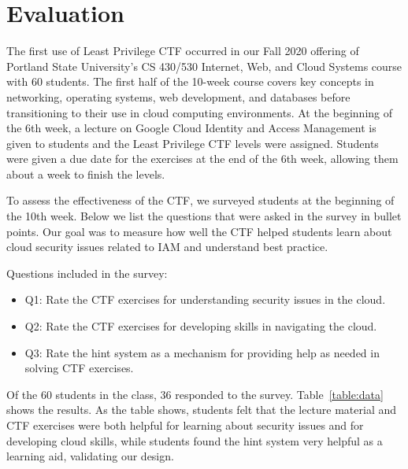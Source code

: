 \documentclass[sigconf]{acmart}
\begin{document}
\section{Evaluation}
 
The first use of Least Privilege CTF occurred in our Fall 2020 offering of Portland State University's CS 430/530 Internet, Web, and Cloud Systems course with 60 students.  The first half of the 10-week course covers key concepts in networking, operating systems, web development, and databases before transitioning to their use in cloud computing environments. At the beginning of the 6th week, a lecture on Google Cloud Identity and Access Management is given to students and the Least Privilege CTF levels were assigned. Students were given a due date for the exercises at the end of the 6th week, allowing them about a week to finish the levels.

To assess the effectiveness of the CTF, we surveyed students at the beginning of the 10th week. Below we list the questions that were asked in the survey in bullet points.  Our goal was to measure how well the CTF helped students learn about cloud security issues related to IAM and understand best practice.  

Questions included in the survey:
\begin{itemize}
\item Q1: Rate the CTF exercises for understanding security issues in the cloud.
\item Q2: Rate the CTF exercises for developing skills in navigating the cloud.
\item Q3: Rate the hint system as a mechanism for providing help as needed in solving CTF exercises.
\end{itemize}

Of the 60 students in the class, 36 responded to the survey.  Table~\ref{table:data} shows the results.  As the table shows, students felt that the lecture material and CTF exercises were both helpful for learning about security issues and for developing cloud skills, while students found the hint system very helpful as a learning aid, validating our design.
\end{document}
